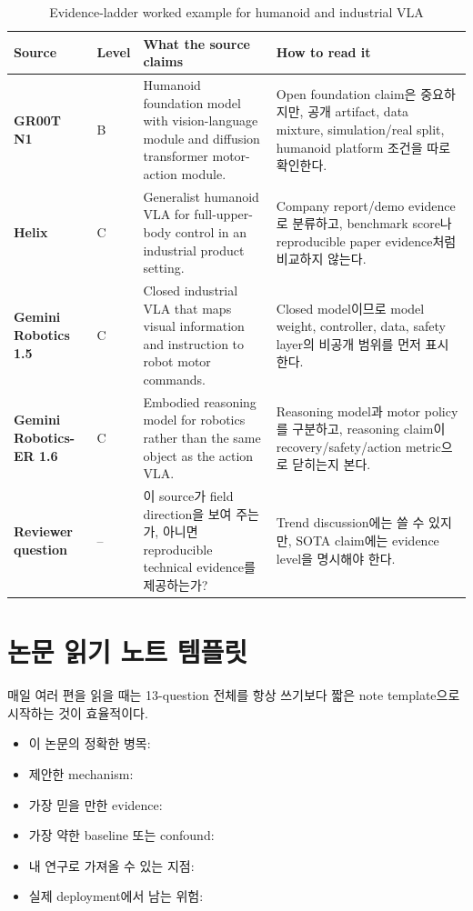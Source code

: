 \begin{table}[t]
  \centering
  \small
  \caption{Evidence-ladder worked example for humanoid and industrial VLA}
  \label{tab:industrial_vla_evidence_worked_example}
  \begin{tabularx}{\textwidth}{>{\bfseries}p{26mm}p{18mm}p{34mm}X}
    \toprule
    Source & Level & What the source claims & How to read it \\
    \midrule
    GR00T N1 & B & Humanoid foundation model with vision-language module and diffusion transformer motor-action module. & Open foundation claim은 중요하지만, 공개 artifact, data mixture, simulation/real split, humanoid platform 조건을 따로 확인한다. \\
    Helix & C & Generalist humanoid VLA for full-upper-body control in an industrial product setting. & Company report/demo evidence로 분류하고, benchmark score나 reproducible paper evidence처럼 비교하지 않는다. \\
    Gemini Robotics 1.5 & C & Closed industrial VLA that maps visual information and instruction to robot motor commands. & Closed model이므로 model weight, controller, data, safety layer의 비공개 범위를 먼저 표시한다. \\
    Gemini Robotics-ER 1.6 & C & Embodied reasoning model for robotics rather than the same object as the action VLA. & Reasoning model과 motor policy를 구분하고, reasoning claim이 recovery/safety/action metric으로 닫히는지 본다. \\
    Reviewer question & -- & 이 source가 field direction을 보여 주는가, 아니면 reproducible technical evidence를 제공하는가? & Trend discussion에는 쓸 수 있지만, SOTA claim에는 evidence level을 명시해야 한다. \\
    \bottomrule
  \end{tabularx}
\end{table}

\section{논문 읽기 노트 템플릿}

매일 여러 편을 읽을 때는 13-question 전체를 항상 쓰기보다 짧은 note template으로 시작하는 것이 효율적이다.

\begin{itemize}
  \item 이 논문의 정확한 병목:
  \item 제안한 mechanism:
  \item 가장 믿을 만한 evidence:
  \item 가장 약한 baseline 또는 confound:
  \item 내 연구로 가져올 수 있는 지점:
  \item 실제 deployment에서 남는 위험:
\end{itemize}

